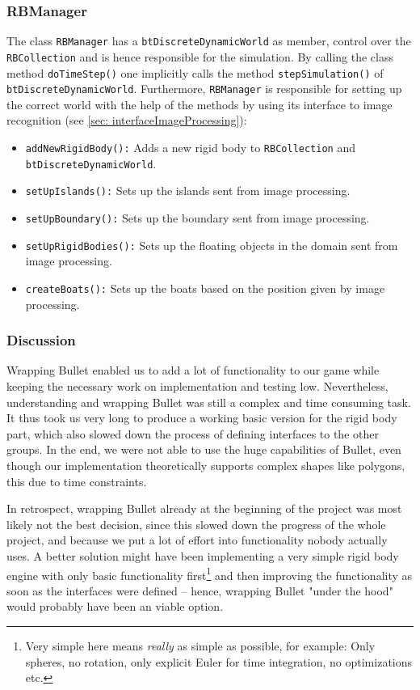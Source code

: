 \subsubsection*{RBManager}
\label{sec: rbManager}
The class \texttt{RBManager} has a \texttt{btDiscreteDynamicWorld} as member, control over the \texttt{RBCollection} and is hence responsible for the simulation. By calling the class method \texttt{doTimeStep()} one implicitly calls the method \texttt{stepSimulation()} of \texttt{btDiscreteDynamicWorld}. Furthermore, \texttt{RBManager} is responsible for setting up the correct world with the help of the methods by using its interface to image recognition (see \ref{sec: interfaceImageProcessing}):
\begin{itemize}
\item \texttt{addNewRigidBody():} Adds a new rigid body to \texttt{RBCollection} and \texttt{btDiscreteDynamicWorld}.
\item \texttt{setUpIslands():} Sets up the islands sent from image processing.
\item \texttt{setUpBoundary():} Sets up the boundary sent from image processing.
\item \texttt{setUpRigidBodies():} Sets up the floating objects in the domain sent from image processing.
\item \texttt{createBoats():} Sets up the boats based on the position given by image processing.
\end{itemize}

\subsubsection{Discussion}
Wrapping Bullet enabled us to add a lot of functionality to our game while keeping the necessary work on implementation and testing low. Nevertheless, understanding and wrapping Bullet was still a complex and time consuming task. It thus took us very long to produce a working basic version for the rigid body part, which also slowed down the process of defining interfaces to the other groups. In the end, we were not able to use the huge capabilities of Bullet, even though our implementation theoretically supports complex shapes like polygons, this due to time constraints.

In retrospect, wrapping Bullet already at the beginning of the project was most likely not the best decision, since this slowed down the progress of the whole project, and because we put a lot of effort into functionality nobody actually uses. A better solution might have been implementing a very simple rigid body engine with only basic functionality first\footnote{Very simple here means \emph{really} as simple as possible, for example: Only spheres, no rotation, only explicit Euler for time integration, no optimizations etc.} and then improving the functionality as soon as the interfaces were defined -- hence, wrapping Bullet "under the hood" would probably have been an viable option.

